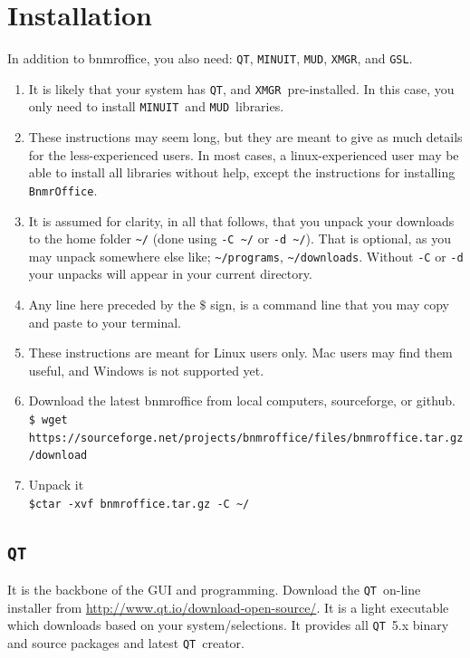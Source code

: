 \documentclass[10pt,letterpaper,oneside]{article}
\newcommand{\qt}{\texttt{QT}}
\newcommand{\minuit}{\texttt{MINUIT}}
\newcommand{\mud}{\texttt{MUD}}
\newcommand{\xmgr}{\texttt{XMGR}}
\newcommand{\bof}{\texttt{BnmrOffice}}
\newcommand{\gsl}{\texttt{GSL}}
\begin{document}
\section{Installation}
In addition to bnmroffice, you also need: \qt, \minuit, \mud, \xmgr, and \gsl.
\begin{enumerate}
\item It is likely that your system has \qt, and \xmgr\ pre-installed. In this case, 
you only need to install \minuit\ and \mud\ libraries. 
\item These instructions may seem long, but they are meant to give as much details for the less-experienced users. In most cases, a linux-experienced user may be able to install all libraries without help, except the instructions for installing \bof.
 \item It is assumed for clarity, in all that follows, that you unpack your downloads   to the home folder \verb+~/+ (done using 
       \verb+-C ~/+ or \verb+-d ~/+). That is optional, as you may unpack somewhere else like; \verb+~/programs+, \verb+~/downloads+. 
       Without \verb+-C+ or \verb+-d+ your unpacks will appear in your current directory.
 \item  Any line here preceded by the $\$$ sign, is a command line that you may copy  and paste to your terminal. 
 \item  These instructions are meant for Linux users only. Mac users may find them useful, and Windows is not supported yet.
 \item Download the latest bnmroffice from local computers, sourceforge, or github.\\
\verb+$ wget https://sourceforge.net/projects/bnmroffice/files/bnmroffice.tar.gz/download+
 \item  Unpack it  \\     \verb+$ctar -xvf bnmroffice.tar.gz -C ~/+
\end{enumerate}


\subsection{\qt}
It is the backbone of the GUI and programming. Download the \qt\ on-line installer from \url{http://www.qt.io/download-open-source/}. It is a light executable which downloads based on your system/selections. It provides all \qt\ 5.x binary and source packages and latest \qt\ creator.
\end{document}
